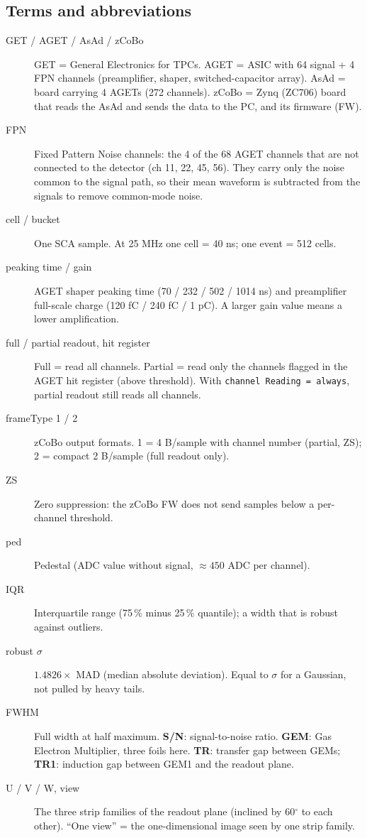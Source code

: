 \documentclass[a4paper,11pt]{article}
\begin{document}
\subsection{Terms and abbreviations}
\begin{description}
\item[GET / AGET / AsAd / zCoBo] GET = General Electronics for TPCs. AGET = ASIC with 64 signal + 4 FPN channels (preamplifier, shaper, switched-capacitor array). AsAd = board carrying 4 AGETs (272 channels). zCoBo = Zynq (ZC706) board that reads the AsAd and sends the data to the PC, and its firmware (FW).
\item[FPN] Fixed Pattern Noise channels: the 4 of the 68 AGET channels that are not connected to the detector (ch 11, 22, 45, 56). They carry only the noise common to the signal path, so their mean waveform is subtracted from the signals to remove common-mode noise.
\item[cell / bucket] One SCA sample. At 25 MHz one cell = 40 ns; one event = 512 cells.
\item[peaking time / gain] AGET shaper peaking time (70 / 232 / 502 / 1014 ns) and preamplifier full-scale charge (120 fC / 240 fC / 1 pC). A larger gain value means a lower amplification.
\item[full / partial readout, hit register] Full = read all channels. Partial = read only the channels flagged in the AGET hit register (above threshold). With \texttt{channel Reading = always}, partial readout still reads all channels.
\item[frameType 1 / 2] zCoBo output formats. 1 = 4 B/sample with channel number (partial, ZS); 2 = compact 2 B/sample (full readout only).
\item[ZS] Zero suppression: the zCoBo FW does not send samples below a per-channel threshold.
\item[ped] Pedestal (ADC value without signal, $\approx 450$ ADC per channel).
\item[IQR] Interquartile range (75\,\% minus 25\,\% quantile); a width that is robust against outliers.
\item[robust $\sigma$] $1.4826 \times$ MAD (median absolute deviation). Equal to $\sigma$ for a Gaussian, not pulled by heavy tails.
\item[FWHM] Full width at half maximum. \textbf{S/N}: signal-to-noise ratio. \textbf{GEM}: Gas Electron Multiplier, three foils here. \textbf{TR}: transfer gap between GEMs; \textbf{TR1}: induction gap between GEM1 and the readout plane.
\item[U / V / W, view] The three strip families of the readout plane (inclined by 60$^\circ$ to each other). ``One view'' = the one-dimensional image seen by one strip family.
\end{description}
\end{document}
